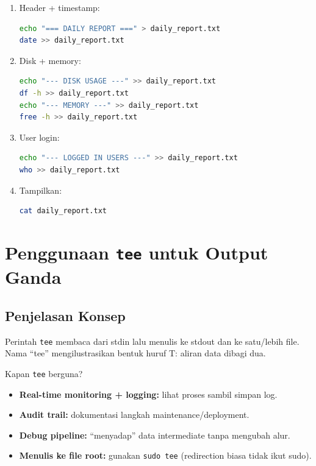 \begin{enumerate}
    \item Header + timestamp:
\begin{lstlisting}[language=bash, caption={Membuat header laporan}]
echo "=== DAILY REPORT ===" > daily_report.txt
date >> daily_report.txt
\end{lstlisting}

    \item Disk + memory:
\begin{lstlisting}[language=bash, caption={Tambahkan disk dan memory}]
echo "--- DISK USAGE ---" >> daily_report.txt
df -h >> daily_report.txt
echo "--- MEMORY ---" >> daily_report.txt
free -h >> daily_report.txt
\end{lstlisting}

    \item User login:
\begin{lstlisting}[language=bash, caption={Tambahkan user login}]
echo "--- LOGGED IN USERS ---" >> daily_report.txt
who >> daily_report.txt
\end{lstlisting}

    \item Tampilkan:
\begin{lstlisting}[language=bash, caption={Tampilkan laporan}]
cat daily_report.txt
\end{lstlisting}
\end{enumerate}

\section{Penggunaan \texttt{tee} untuk Output Ganda}
\label{sec:tee}

\subsection*{Penjelasan Konsep}
Perintah \texttt{tee} membaca dari stdin lalu menulis ke stdout dan ke satu/lebih file.
Nama ``tee'' mengilustrasikan bentuk huruf T: aliran data dibagi dua.

Kapan \texttt{tee} berguna?
\begin{itemize}
    \item \textbf{Real-time monitoring + logging:} lihat proses sambil simpan log.
    \item \textbf{Audit trail:} dokumentasi langkah maintenance/deployment.
    \item \textbf{Debug pipeline:} ``menyadap'' data intermediate tanpa mengubah alur.
    \item \textbf{Menulis ke file root:} gunakan \texttt{sudo tee} (redirection biasa tidak ikut sudo).
\end{itemize}

